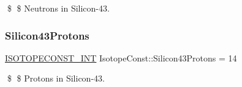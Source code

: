 \$ \$ Neutrons in Silicon-\/43. \mbox{\label{group___isotope_const-_silicon-_si43_ga452aad5fe2135f916518d881fc9a44cc}} 
\subsubsection{\texorpdfstring{Silicon43\+Protons}{Silicon43Protons}}
{\footnotesize\ttfamily \mbox{\hyperlink{group___isotope_const-_macros_ga5f18360b3e99483a35c32d789e62621c}{I\+S\+O\+T\+O\+P\+E\+C\+O\+N\+S\+T\+\_\+\+I\+NT}} Isotope\+Const\+::\+Silicon43\+Protons = 14}

\$ \$ Protons in Silicon-\/43. 